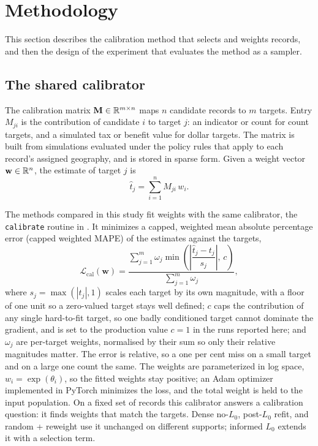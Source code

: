 \section{Methodology}
\label{sec:methodology}

This section describes the calibration method that selects and weights records, and then the design
of the experiment that evaluates the method as a sampler.

\subsection{The shared calibrator}

The calibration matrix $\mathbf{M} \in \mathbb{R}^{m \times n}$ maps $n$ candidate records to $m$ targets.
Entry $M_{ji}$ is the contribution of candidate $i$ to target $j$: an indicator or count for count
targets, and a simulated tax or benefit value for dollar targets. The matrix is built from
\policyengine{} simulations evaluated under the policy rules that apply to each record's assigned
geography, and is stored in sparse form. Given a weight vector $\mathbf{w} \in \mathbb{R}^n$, the estimate of
target $j$ is
\begin{equation}
    \hat{t}_j = \sum_{i=1}^{n} M_{ji}\, w_i.
    \label{eq:estimate}
\end{equation}

The methods compared in this study fit weights with the same calibrator, the \texttt{calibrate}
routine in \microcosm{}. It minimizes a capped, weighted mean absolute percentage error (capped weighted
MAPE) of the estimates against the targets,
\begin{equation}
    \mathcal{L}_{\mathrm{cal}}(\mathbf{w}) =
    \frac{\sum_{j=1}^{m} \omega_j \min\!\left(\left|\dfrac{\hat{t}_j - t_j}{s_j}\right|,\, c\right)}
         {\sum_{j=1}^{m} \omega_j},
    \label{eq:loss_cal}
\end{equation}
where $s_j = \max(|t_j|, 1)$ scales each target by its own magnitude, with a floor of one unit so a
zero-valued target stays well defined; $c$ caps the contribution of any single hard-to-fit target, so
one badly conditioned target cannot dominate the gradient, and is set to the production value $c = 1$ in
the runs reported here; and $\omega_j$ are
per-target weights, normalised by their sum so only their relative magnitudes matter. The error is
relative, so a one per cent miss on a small target and on a large one count the same. The weights are
parameterized in log space, $w_i = \exp(\theta_i)$, so the fitted weights stay positive; an Adam
optimizer \citep{kingma2015} implemented in PyTorch \citep{pytorch2019} minimizes the loss, and the
total weight is held to the input population. On a fixed set of records this calibrator answers a
calibration question: it finds weights that match the targets. Dense no-$L_0$, post-$L_0$ refit, and
random + reweight use it unchanged on different supports; informed $L_0$ extends it with a selection
term.

